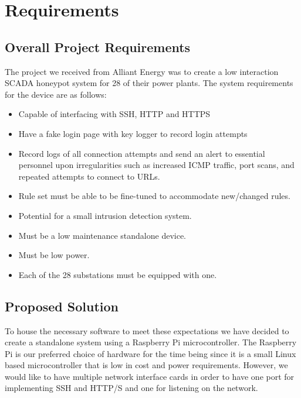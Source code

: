 \chapter{Requirements}

\section{Overall Project Requirements}

The project we received from Alliant Energy was to create a low interaction SCADA honeypot system for 28 of their power plants.  The system requirements for the device are as follows:

\begin{itemize}
    \item Capable of interfacing with SSH, HTTP and HTTPS
    \item Have a fake login page with key logger to record login attempts 
    \item Record logs of all connection attempts and send an alert to essential personnel upon irregularities such as increased ICMP traffic, port scans, and repeated attempts to connect to URLs.
    \item Rule set must be able to be fine-tuned to accommodate new/changed rules.
    \item Potential for a small intrusion detection system.
    \item Must be a low maintenance standalone device.
    \item Must be low power.
    \item Each of the 28 substations must be equipped with one.
\end{itemize}


\section{Proposed Solution}

To house the necessary software to meet these expectations we have decided to create a standalone system using a Raspberry Pi
microcontroller.  The Raspberry Pi is our preferred choice of hardware for the time being since it is a small Linux based
microcontroller that is low in cost and power requirements.  However, we would like to have multiple network interface cards in
order to have one port for implementing SSH and HTTP/S and one for listening on the network.

